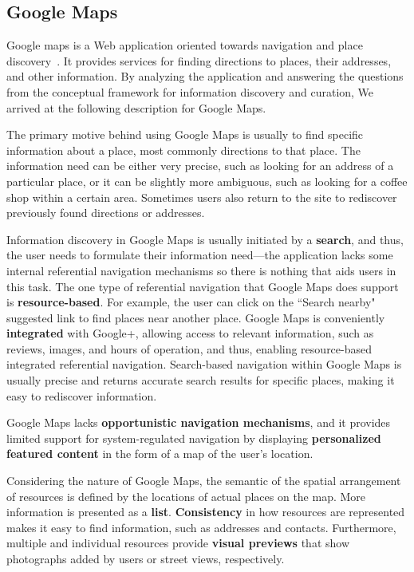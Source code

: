 \documentclass{sigchi}
\begin{document}
{\subsection{Google Maps}
Google maps is a Web application oriented towards navigation and place discovery~\cite{gibson2006google}. It provides services for finding directions to places, their addresses, and other information. By analyzing the application and answering the questions from the conceptual framework for information discovery and curation, We arrived at the following description for Google Maps.

The primary motive behind using Google Maps is usually to find specific information about a place, most commonly directions to that place. The information need can be either very precise, such as looking for an address of a particular place, or it can be slightly more ambiguous, such as looking for a coffee shop within a certain area. Sometimes users also return to the site to rediscover previously found directions or addresses.

Information discovery in Google Maps is usually initiated by a \textbf{search}, and thus, the user needs to formulate their information need---the application lacks some internal referential navigation mechanisms so there is nothing that aids users in this task. The one type of referential navigation that Google Maps does support is \textbf{resource-based}. For example, the user can click on the ``Search nearby" suggested link to find places near another place. Google Maps is conveniently \textbf{integrated} with Google+, allowing access to relevant information, such as reviews, images, and hours of operation, and thus, enabling resource-based integrated referential navigation. Search-based navigation within Google Maps is usually precise and returns accurate search results for specific places, making it easy to rediscover information. 

Google Maps lacks \textbf{opportunistic navigation mechanisms}, and it provides limited support for system-regulated navigation by displaying \textbf{personalized featured content} in the form of a map of the user's location.  

Considering the nature of Google Maps, the semantic of the spatial arrangement of resources is defined by the locations of actual places on the map. More information is presented as a \textbf{list}. \textbf{Consistency} in how resources are represented makes it easy to find information, such as addresses and contacts. Furthermore, multiple and individual resources provide \textbf{visual previews} that show photographs added by users or street views, respectively.

}
\end{document}
